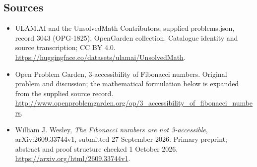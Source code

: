 \documentclass[11pt,a4paper]{article}
\begin{document}
\subsection{Sources}
\begin{itemize}
\item[S1] ULAM.AI and the UnsolvedMath Contributors, supplied problems.json, record 3043 (OPG-1825), OpenGarden collection. Catalogue identity and source transcription; CC BY 4.0.
\url{https://huggingface.co/datasets/ulamai/UnsolvedMath}.
\item[S2] Open Problem Garden, 3-accessibility of Fibonacci numbers. Original problem and discussion; the mathematical formulation below is expanded from the supplied source record.
\url{http://www.openproblemgarden.org/op/3_accessibility_of_fibonacci_numbers}.

\item[R1] William J. Wesley, \emph{The Fibonacci numbers are not
3-accessible}, arXiv:2609.33744v1, submitted 27 September 2026.
Primary preprint; abstract and proof structure checked 1 October 2026.
\url{https://arxiv.org/html/2609.33744v1}.

\end{itemize}
\end{document}
